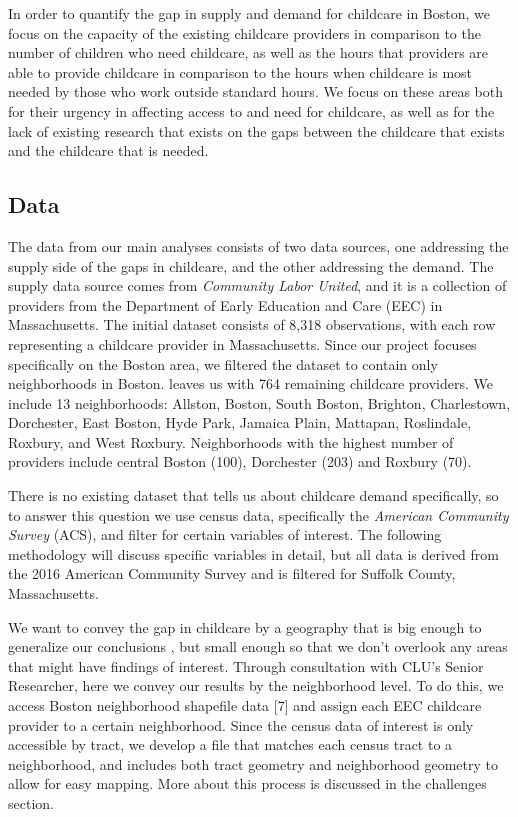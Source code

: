 \documentclass[10pt,letterpaper]{article}
\begin{document}
In order to quantify the gap in supply and demand for childcare in
Boston, we focus on the capacity of the existing childcare providers in
comparison to the number of children who need childcare, as well as the
hours that providers are able to provide childcare in comparison to the
hours when childcare is most needed by those who work outside standard
hours. We focus on these areas both for their urgency in affecting
access to and need for childcare, as well as for the lack of existing
research that exists on the gaps between the childcare that exists and
the childcare that is needed.

\subsection{Data}\label{data}

The data from our main analyses consists of two data sources, one
addressing the supply side of the gaps in childcare, and the other
addressing the demand. The supply data source comes from \emph{Community
Labor United}, and it is a collection of providers from the Department
of Early Education and Care (EEC) in Massachusetts. The initial dataset
consists of 8,318 observations, with each row representing a childcare
provider in Massachusetts. Since our project focuses specifically on the
Boston area, we filtered the dataset to contain only neighborhoods in
Boston. leaves us with 764 remaining childcare providers. We include 13
neighborhoods: Allston, Boston, South Boston, Brighton, Charlestown,
Dorchester, East Boston, Hyde Park, Jamaica Plain, Mattapan, Roslindale,
Roxbury, and West Roxbury. Neighborhoods with the highest number of
providers include central Boston (100), Dorchester (203) and Roxbury
(70).

There is no existing dataset that tells us about childcare demand
specifically, so to answer this question we use census data,
specifically the \emph{American Community Survey} (ACS), and filter for
certain variables of interest. The following methodology will discuss
specific variables in detail, but all data is derived from the 2016
American Community Survey and is filtered for Suffolk County,
Massachusetts.

We want to convey the gap in childcare by a geography that is big enough
to generalize our conclusions , but small enough so that we don't
overlook any areas that might have findings of interest. Through
consultation with CLU's Senior Researcher, here we convey our results by
the neighborhood level. To do this, we access Boston neighborhood
shapefile data {[}7{]} and assign each EEC childcare provider to a
certain neighborhood. Since the census data of interest is only
accessible by tract, we develop a file that matches each census tract to
a neighborhood, and includes both tract geometry and neighborhood
geometry to allow for easy mapping. More about this process is discussed
in the challenges section.
\end{document}
